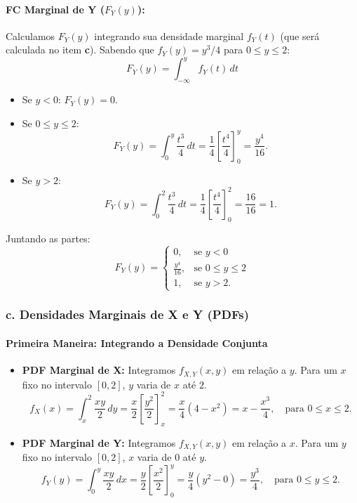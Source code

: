 \documentclass[12pt]{article}
\begin{document}
\paragraph{FC Marginal de Y ($F_Y(y)$):}
Calculamos $F_Y(y)$ integrando sua densidade marginal $f_Y(t)$ (que será calculada no item \textbf{c}).
Sabendo que $f_Y(y) = y^3/4$ para $0 \le y \le 2$:
\[ F_Y(y) = \int_{-\infty}^{y} f_Y(t) \,dt \]
\begin{itemize}
    \item Se $y < 0$: $F_Y(y) = 0$.
    \item Se $0 \le y \le 2$:
    \[ F_Y(y) = \int_0^y \frac{t^3}{4} \,dt = \frac{1}{4} \left[ \frac{t^4}{4} \right]_0^y = \frac{y^4}{16}. \]
    \item Se $y > 2$:
    \[ F_Y(y) = \int_0^2 \frac{t^3}{4} \,dt = \frac{1}{4} \left[ \frac{t^4}{4} \right]_0^2 = \frac{16}{16} = 1. \]
\end{itemize}
Juntando as partes:
\[ F_Y(y) = \begin{cases} 0, & \text{se } y < 0 \\ \frac{y^4}{16}, & \text{se } 0 \le y \le 2 \\ 1, & \text{se } y > 2. \end{cases} \]

\subsubsection*{c. Densidades Marginais de X e Y (PDFs)}

\paragraph{Primeira Maneira: Integrando a Densidade Conjunta}
\begin{itemize}
    \item \textbf{PDF Marginal de X:} Integramos $f_{X,Y}(x,y)$ em relação a $y$. Para um $x$ fixo no intervalo $[0,2]$, $y$ varia de $x$ até $2$.
    \[ f_X(x) = \int_x^2 \frac{xy}{2} \,dy = \frac{x}{2} \left[ \frac{y^2}{2} \right]_x^2 = \frac{x}{4} (4 - x^2) = x - \frac{x^3}{4}, \quad \text{para } 0 \le x \le 2. \]
    \item \textbf{PDF Marginal de Y:} Integramos $f_{X,Y}(x,y)$ em relação a $x$. Para um $y$ fixo no intervalo $[0,2]$, $x$ varia de $0$ até $y$.
    \[ f_Y(y) = \int_0^y \frac{xy}{2} \,dx = \frac{y}{2} \left[ \frac{x^2}{2} \right]_0^y = \frac{y}{4} (y^2 - 0) = \frac{y^3}{4}, \quad \text{para } 0 \le y \le 2. \]
\end{itemize}
\end{document}
